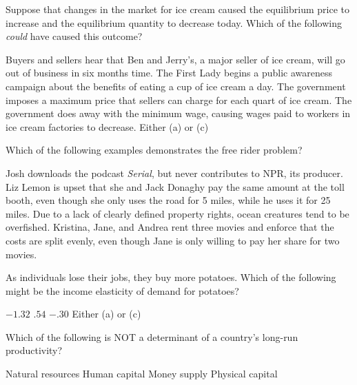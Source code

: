 \documentclass[addpoints,11pt]{exam}
\theoremstyle{definition}
\begin{document}
\begin{questions}
	\question Suppose that changes in the market for ice cream caused the equilibrium price to increase and the equilibrium quantity to decrease today. Which of the following \textit{could} have caused this outcome?
	
	\begin{choices}
		\CorrectChoice Buyers and sellers hear that Ben and Jerry's, a major seller of ice cream, will go out of business in six months time.
		\choice The First Lady begins a public awareness campaign about the benefits of eating a cup of ice cream a day.
		\choice The government imposes a maximum price that sellers can charge for each quart of ice cream.
		\choice The government does away with the minimum wage, causing wages paid to workers in ice cream factories to decrease.
		\choice Either (a) or (c)
	\end{choices}
	

	
	\question Which of the following examples demonstrates the free rider problem?
	
	\begin{choices}
		\CorrectChoice Josh downloads the podcast \textit{Serial}, but never contributes to NPR, its producer.
		\choice Liz Lemon is upset that she and Jack Donaghy pay the same amount at the toll booth, even though she only uses the road for 5 miles, while he uses it for 25 miles.
		\choice Due to a lack of clearly defined property rights, ocean creatures tend to be overfished.
		\choice Kristina, Jane, and Andrea rent three movies and enforce that the costs are split evenly, even though Jane is only willing to pay her share for two movies.
	\end{choices}
	
	\question As individuals lose their jobs, they buy more potatoes. Which of the following might be the income elasticity of demand for potatoes?
	
	\begin{choices}
		\choice $-1.32$
		\choice $.54$
		\choice $-.30$
		\CorrectChoice Either (a) or (c)
	\end{choices}
	
	\question Which of the following is NOT a determinant of a country's long-run productivity?
	
	\begin{choices}
		\choice Natural resources
		\choice Human capital
		\CorrectChoice Money supply
		\choice Physical capital
	\end{choices}
	

\end{questions}
\end{document}
